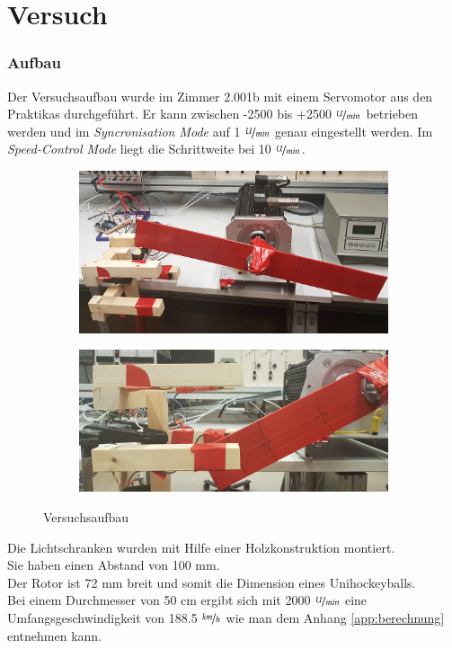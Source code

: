\part{Versuch}
\section{Aufbau}
Der Versuchsaufbau wurde im Zimmer 2.001b mit einem Servomotor aus den Praktikas durchgeführt. Er kann zwischen -2500 bis +2500 $\nicefrac{U}{min}$ betrieben werden und im \textit{Syncronisation Mode} auf 1 $\nicefrac{U}{min}$ genau eingestellt werden. Im \textit{Speed-Control Mode} liegt die Schrittweite bei 10 $\nicefrac{U}{min}$.

\begin{figure}[ht]
    \centering
    \begin{subfigure}[c]{0.8\textwidth}       
        \includegraphics[width=\textwidth]{images/Aufbau.jpg}
    \end{subfigure}

    \begin{subfigure}[c]{0.8\textwidth}
        \includegraphics[width=\textwidth]{images/AufbauDetail.jpg}
    \end{subfigure}
    \caption{Versuchsaufbau}\label{fig:Aufbau}   
\end{figure}

Die Lichtschranken wurden mit Hilfe einer Holzkonstruktion montiert.\\
Sie haben einen Abstand von 100 mm.\\
Der  Rotor ist 72 mm breit und somit die Dimension eines Unihockeyballs.\\

Bei einem Durchmesser von 50 cm ergibt sich mit 2000 $\nicefrac{U}{min}$ eine Umfangsgeschwindigkeit von 188.5 $\nicefrac{km}{h}$ wie man dem Anhang \ref{app:berechnung} entnehmen kann.